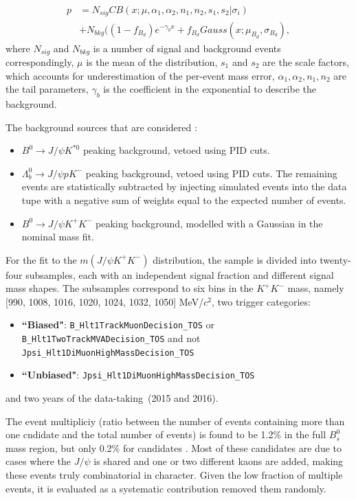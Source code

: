 \begin{align*}
p &= N_{sig} CB(x;\mu,\alpha_1,\alpha_2,n_1,n_2,s_1,s_2 | \sigma_{i}) \\
&+ N_{bkg}((1-f_{B_d})e^{-\gamma_b x} + f_{B_d} Gauss(x;\mu_{B_d},\sigma_{B_d}),
\end{align*}
where $N_{sig}$ and $N_{bkg}$ is a number of signal and background events
correspondingly, $\mu$ is the mean of the distribution,
$s_1$ and $s_2$ are the scale factors, which accounts for underestimation of the per-event
mass error, $\alpha_1, \alpha_2, n_1, n_2$ are the tail parameters,
$\gamma_b$ is the coefficient in the exponential to describe the background.

The background sources that are considered :
\begin{itemize}
\item $B^0 \rightarrow J/\psi K^{*0}$ peaking background, vetoed using PID cuts. 
\item $\Lambda_b^0 \rightarrow J/\psi pK^-$ peaking background, vetoed using PID cuts. The remaining events are statistically subtracted by injecting simulated events into the data tupe with a negative sum of weights equal to the expected number of events. 
\item $B^0 \rightarrow J/\psi K^+ K^-$ peaking background, modelled with a Gaussian in the nominal mass fit. 
\end{itemize}

For the fit to the $m(J/\psi K^+ K^-)$ distribution, the sample is divided
into twenty-four subsamples, each with an independent signal fraction and different
signal mass shapes. The subsamples correspond to six bins in the $K^+K^-$ mass,
namely [990, 1008, 1016, 1020, 1024, 1032, 1050] MeV/$c^2$, two trigger 
categories:
\begin{itemize}
\item \textbf{``Biased"}: {\tt B\_Hlt1TrackMuonDecision\_TOS} or {\tt B\_Hlt1TwoTrackMVADecision\_TOS} and not {\tt Jpsi\_Hlt1DiMuonHighMassDecision\_TOS} 
\item \textbf{``Unbiased"}: {\tt Jpsi\_Hlt1DiMuonHighMassDecision\_TOS}
\end{itemize}
and two years of the data-taking~(2015 and 2016). 

The event multipliciy (ratio between the number of events containing more than one cndidate and the total number of events) is found to be 1.2\% in the full $B_s^0$ mass region, but only 0.2\% for candidates . Most of these candidates 
are due to cases where the $J/\psi$ is shared and one or two different kaons are added, making these events truly combinatorial in character. Given the low fraction of multiple events, it is evaluated as a systematic contribution removed them randomly. 


